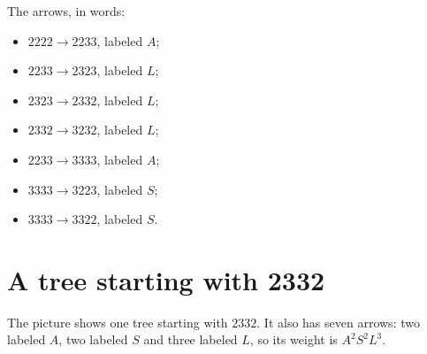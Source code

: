 The arrows, in words:
\begin{itemize}
\item $2222 \to 2233$, labeled $A$;
\item $2233 \to 2323$, labeled $L$;
\item $2323 \to 2332$, labeled $L$;
\item $2332 \to 3232$, labeled $L$;
\item $2233 \to 3333$, labeled $A$;
\item $3333 \to 3223$, labeled $S$;
\item $3333 \to 3322$, labeled $S$.
\end{itemize}


\section{A tree starting with 2332}

The picture shows one tree starting with $2332$. It also has seven arrows:
two labeled $A$, two labeled $S$ and three labeled $L$, so its weight is
$A^2S^2L^3$.

